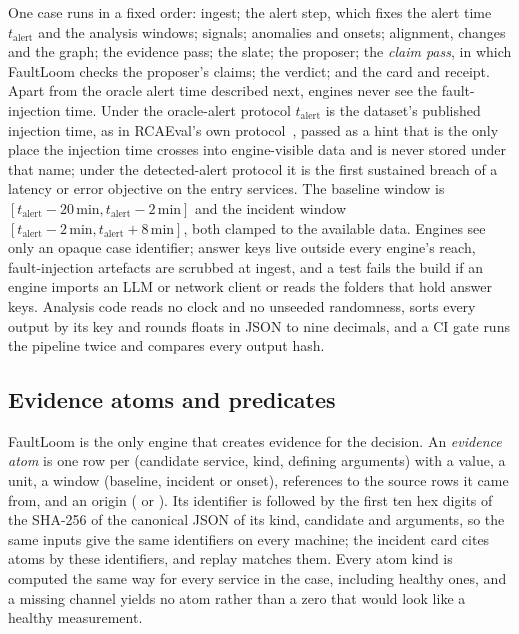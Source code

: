 One case runs in a fixed order: ingest; the alert step, which fixes the alert time $t_\text{alert}$ and the analysis windows; signals; anomalies and onsets; alignment, changes and the graph; the evidence pass; the slate; the proposer; the \emph{claim pass}, in which FaultLoom checks the proposer's claims; the verdict; and the card and receipt.
Apart from the oracle alert time described next, engines never see the fault-injection time.
Under the oracle-alert protocol $t_\text{alert}$ is the dataset's published injection time, as in RCAEval's own protocol~\cite{rcaeval2024}, passed as a hint that is the only place the injection time crosses into engine-visible data and is never stored under that name; under the detected-alert protocol it is the first sustained breach of a latency or error objective on the entry services.
The baseline window is $[t_\text{alert}-20\,\text{min}, t_\text{alert}-2\,\text{min}]$ and the incident window $[t_\text{alert}-2\,\text{min}, t_\text{alert}+8\,\text{min}]$, both clamped to the available data.
Engines see only an opaque case identifier; answer keys live outside every engine's reach, fault-injection artefacts are scrubbed at ingest, and a test fails the build if an engine imports an LLM or network client or reads the folders that hold answer keys.
Analysis code reads no clock and no unseeded randomness, sorts every output by its key and rounds floats in JSON to nine decimals, and a CI gate runs the pipeline twice and compares every output hash.


\subsection{Evidence atoms and predicates}
\label{sec:evidence}

FaultLoom is the only engine that creates evidence for the decision.
An \emph{evidence atom} is one row per (candidate service, kind, defining arguments) with a value, a unit, a window (baseline, incident or onset), references to the source rows it came from, and an origin ( or ).
Its identifier is  followed by the first ten hex digits of the SHA-256 of the canonical JSON of its kind, candidate and arguments, so the same inputs give the same identifiers on every machine; the incident card cites atoms by these identifiers, and replay matches them.
Every atom kind is computed the same way for every service in the case, including healthy ones, and a missing channel yields no atom rather than a zero that would look like a healthy measurement.

